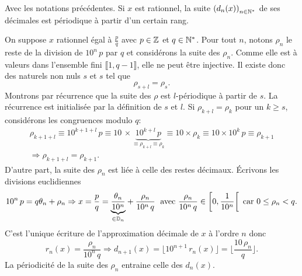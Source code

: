 \begin{propn}
 Avec les notations précédentes. Si $x$ est rationnel, la suite $\left( d_n(x) \right)_{n \in \mathbb{N}^*}$ de ses décimales est périodique à partir d'un certain rang. 
\end{propn}
\begin{demo}
 On suppose $x$ rationnel égal à $\frac{p}{q}$ avec $p\in \mathbb{Z}$ et $q\in \mathbb{N}^*$.\newline
 Pour tout $n$, notons $\rho_n$ le reste de la division de $10^n\,p$ par $q$ et considérons la suite des $\rho_n$.\newline
 Comme elle est à valeurs dans l'ensemble fini $\llbracket 1, q-1\rrbracket$, elle ne peut être injective. Il existe donc des naturels non nuls $s$ et $s$ tel que 
 \[
  \rho_{s + l} = \rho_s .
 \]
Montrons par récurrence que la suite des $\rho$ est $l$-périodique à partir de $s$. La récurrence est initialisée par la définition de $s$ et $l$. Si $\rho_{k + l} = \rho_k$ pour un $k \geq s$, considérons les congruences modulo $q$:
\begin{multline*}
 \rho_{k + 1 + l} \equiv 10^{k+1+l}\, p \equiv 10\, \times \underset{ \equiv \rho_{k + l} \equiv \rho_k}{\underbrace{10^{k+l}\, p}} 
 \equiv  10\times \rho_{k} \equiv 10\times 10^k\, p \equiv \rho_{k+1} \\
 \Rightarrow \rho_{k + 1 + l} = \rho_{k + 1}.
\end{multline*}
D'autre part, la suite des $\rho_n$ est liée à celle des restes décimaux. \'Ecrivons les divisions euclidiennes
\[
 10^n\,p = q \theta_n + \rho_n
 \Rightarrow
 x = \frac{p}{q} = \underset{\in \mathbb{D}_n}{\underbrace{\frac{\theta_n}{10^n}}} + \frac{\rho_n}{10^n\, q}\; \text{ avec }
 \frac{\rho_n}{10^n\, q} \in \left[ 0, \frac{1}{10^n}\right[ \text{ car } 0 \leq \rho_n < q .
\]
C'est l'unique écriture de l'approximation décimale de $x$ à l'ordre $n$ donc
\[
 r_n(x) = \frac{\rho_n}{10^n\, q}
 \Rightarrow d_{n+1}(x) = \lfloor 10^{n+1}\,r_n(x) \rfloor = \lfloor \frac{10\, \rho_n}{q}\rfloor.
\]
La périodicité de la suite des $\rho_n$ entraine celle des $d_n(x)$.
\end{demo}


